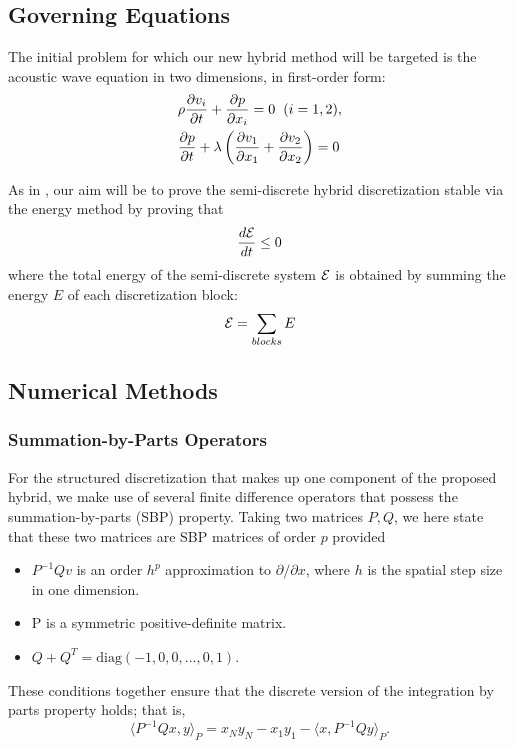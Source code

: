 \subsection{Governing Equations}

The initial problem for which our new hybrid method will be targeted is
the acoustic wave equation in two dimensions, in first-order form:
\begin{align}
&\rho \frac{\partial v_{i}}{\partial t} + \frac{\partial p}{\partial x_{i}} = 0 \hspace{2mm} (i = 1, 2), \\
&\frac{\partial p}{\partial t} + \lambda \left(\frac{\partial v_{1}}{\partial x_{1}} + \frac{\partial v_{2}}{\partial x_{2}} \right) = 0
\end{align}

As in \cite{kozdon2016stable}, our aim will be to prove the semi-discrete hybrid discretization
stable via the energy method by proving that
\begin{align}
\frac{d\mathcal{E}}{dt} \leq 0
\end{align}
where the total energy of the semi-discrete system $\mathcal{E}$ is obtained by summing the
energy $E$ of each discretization block:
\begin{align}
\mathcal{E} = \sum_{blocks} E
\end{align}

\subsection{Numerical Methods}

\subsubsection{Summation-by-Parts Operators}

For the structured discretization that makes up one component of the proposed hybrid, we make use of several
finite difference operators that possess the summation-by-parts (SBP) property. Taking two matrices
${P,Q}$, we here state that these two matrices are SBP matrices of order $p$ provided 
\begin{itemize}
\item $P^{-1}Q v$ is an order $h^{p}$ approximation to $\partial/\partial x$, where $h$ is the spatial step size in one dimension.
\item P is a symmetric positive-definite matrix.
\item $Q + Q^{T} = \text{diag}(-1,0,0,...,0,1)$.
\end{itemize}
These conditions together ensure that the discrete version of the integration by parts property holds; that is,
\[\langle P^{-1}Q x , y\rangle_{P} = x_{N} y_{N} -  x_{1} y_{1} - \langle x,P^{-1}Q y\rangle _{P}. \]

